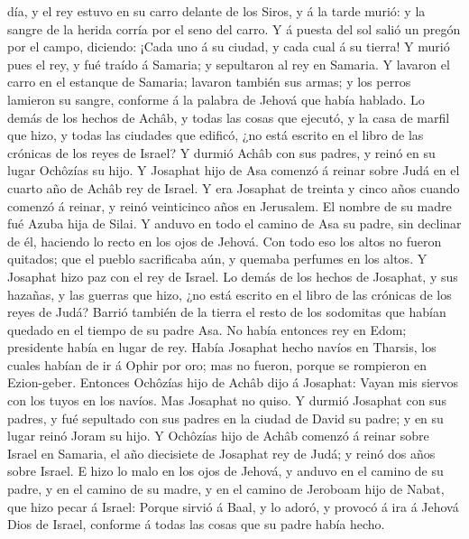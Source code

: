 día, y el rey estuvo en su carro delante de los Siros, y á la tarde
murió: y la sangre de la herida corría por el seno del carro.
 Y á puesta del sol salió un pregón por el campo, diciendo:
¡Cada uno á su ciudad, y cada cual á su tierra!  Y murió
pues el rey, y fué traído á Samaria; y sepultaron al rey en Samaria.
 Y lavaron el carro en el estanque de Samaria; lavaron
también sus armas; y los perros lamieron su sangre, conforme á la
palabra de Jehová que había hablado.  Lo demás de los
hechos de Achâb, y todas las cosas que ejecutó, y la casa de marfil que
hizo, y todas las ciudades que edificó, ¿no está escrito en el libro de
las crónicas de los reyes de Israel?  Y durmió Achâb con
sus padres, y reinó en su lugar Ochôzías su hijo.  Y
Josaphat hijo de Asa comenzó á reinar sobre Judá en el cuarto año de
Achâb rey de Israel.  Y era Josaphat de treinta y cinco
años cuando comenzó á reinar, y reinó veinticinco años en Jerusalem. El
nombre de su madre fué Azuba hija de Silai.  Y anduvo en
todo el camino de Asa su padre, sin declinar de él, haciendo lo recto en
los ojos de Jehová.  Con todo eso los altos no fueron
quitados; que el pueblo sacrificaba aún, y quemaba perfumes en los
altos.  Y Josaphat hizo paz con el rey de Israel.
 Lo demás de los hechos de Josaphat, y sus hazañas, y las
guerras que hizo, ¿no está escrito en el libro de las crónicas de los
reyes de Judá?  Barrió también de la tierra el resto de los
sodomitas que habían quedado en el tiempo de su padre Asa. 
No había entonces rey en Edom; presidente había en lugar de rey.
 Había Josaphat hecho navíos en Tharsis, los cuales habían
de ir á Ophir por oro; mas no fueron, porque se rompieron en
Ezion-geber.  Entonces Ochôzías hijo de Achâb dijo á
Josaphat: Vayan mis siervos con los tuyos en los navíos. Mas Josaphat no
quiso.  Y durmió Josaphat con sus padres, y fué sepultado
con sus padres en la ciudad de David su padre; y en su lugar reinó Joram
su hijo.  Y Ochôzías hijo de Achâb comenzó á reinar sobre
Israel en Samaria, el año diecisiete de Josaphat rey de Judá; y reinó
dos años sobre Israel.  E hizo lo malo en los ojos de
Jehová, y anduvo en el camino de su padre, y en el camino de su madre, y
en el camino de Jeroboam hijo de Nabat, que hizo pecar á Israel: Porque
sirvió á Baal, y lo adoró, y provocó á ira á Jehová Dios de Israel,
conforme á todas las cosas que su padre había hecho.
